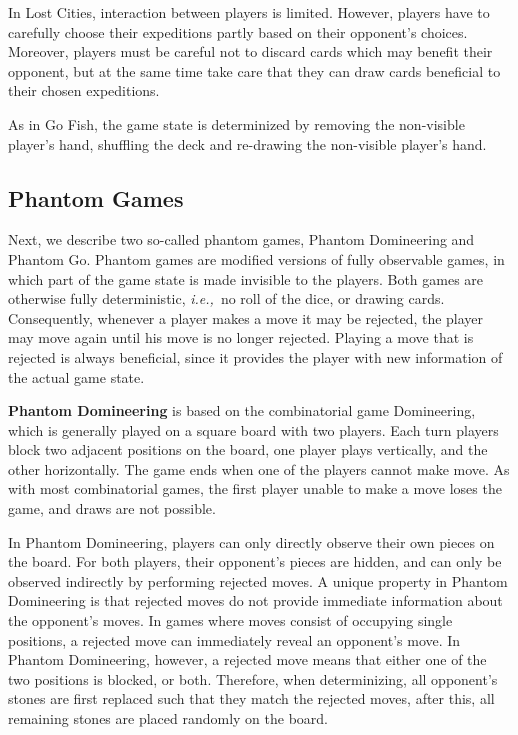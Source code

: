 \documentclass[a4paper]{llncs}
\newcommand{\ie}{{\it i.e.,}~}
\begin{document}
In Lost Cities, interaction between players is limited. However, players have to carefully choose their expeditions partly based on their opponent's choices. Moreover, players must be careful not to discard cards which may benefit their opponent, but at the same time take care that they can draw cards beneficial to their chosen expeditions. 

As in Go Fish, the game state is determinized by removing the non-visible player's hand, shuffling the deck and re-drawing the non-visible player's hand.

\subsection{Phantom Games}

Next, we describe two so-called phantom games, Phantom Domineering and Phantom Go. Phantom games are modified versions of fully observable games, in which part of the game state is made invisible to the players. Both games are otherwise fully deterministic, \ie no roll of the dice, or drawing cards. Consequently, whenever a player makes a move it may be rejected, the player may move again until his move is no longer rejected. Playing a move that is rejected is always beneficial, since it provides the player with new information of the actual game state.

{\sc \bf Phantom Domineering} is based on the combinatorial game Domineering, which is generally played on a square board with two players. Each turn players block two adjacent positions on the board, one player plays vertically, and the other horizontally. The game ends when one of the players cannot make move. As with most combinatorial games, the first player unable to make a move loses the game, and draws are not possible.

In Phantom Domineering, players can only directly observe their own pieces on the board. For both players, their opponent's pieces are hidden, and can only be observed indirectly by performing rejected moves. A unique property in Phantom Domineering is that rejected moves do not provide immediate information about the opponent's moves. In games where moves consist of occupying single positions, a rejected move can immediately reveal an opponent's move. In Phantom Domineering, however, a rejected move means that either one of the two positions is blocked, or both. Therefore, when determinizing, all opponent's stones are first replaced such that they match the rejected moves, after this, all remaining stones are placed randomly on the board.
\end{document}
